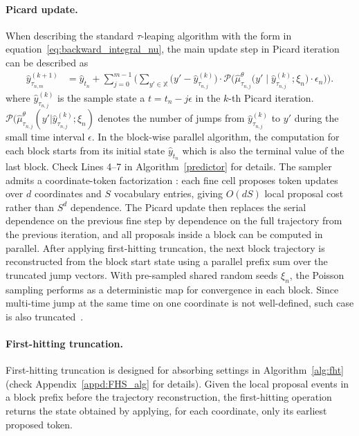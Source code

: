 \documentclass{article}
\def\eqref#1{equation~\ref{#1}}
\begin{document}
\paragraph{Picard update.} When describing the standard $\tau$-leaping algorithm with the form in \eqref{eq:backward_integral_nu}, the main update step in Picard iteration can be described as
\begin{equation}
\begin{split}
\label{eqn:picard_update}
\widehat{y}^{(k+1)}_{\tau_{n,m}}
&=
\widehat{y}_{t_n}
+
\sum\nolimits_{j=0}^{m-1}
\bigg(
\sum\nolimits_{y'\in\mathbb{X}}
\big(
y'-\widehat{y}^{(k)}_{\tau_{n,j}}
\big)
\cdot
\mathcal{P}
\big(
\widehat{\mu}^{\theta}_{\tau_{n,j}}
\big(
y'\mid \widehat{y}^{(k)}_{\tau_{n,j}};\xi_n
\big)
\cdot \epsilon_n
\big)
\bigg).
\end{split}
\end{equation}
where $\widehat{y}^{(k)}_{\tau_{n,j}}$ is the sample state a $t=t_n-j\epsilon$ in the $k$-th Picard iteration. $\mathcal{P}(\widehat{\mu}^{\theta}_{\tau_{n,j}}(y'|\widehat{y}^{(k)}_{\tau_{n,j}};\xi_n)$ denotes the number of jumps from $\widehat{y}^{(k)}_{\tau_{n,j}}$ to $y'$ during the small time interval $\epsilon$. In the block-wise parallel algorithm, the computation for each block starts from its initial state $\widehat{y}_{t_n}$ which is also the terminal value of the last block. Check Lines 4--7 in Algorithm~\ref{predictor} for details. The sampler admits a coordinate-token factorization \citep{campbell2022continuous}: each fine cell proposes token updates over \(d\) coordinates and \(S\) vocabulary entries, giving \(O(dS)\) local proposal cost rather than \(S^d\) dependence.  The Picard update then replaces the serial dependence on the previous fine step by dependence on the full trajectory from the previous iteration, and all proposals inside a block can be computed in parallel. After applying first-hitting truncation, the next block trajectory is reconstructed from the block start state using a parallel prefix sum over the truncated jump vectors. With pre-sampled shared random seeds $\xi_n$, the Poisson sampling performs as a deterministic map for convergence in each block. Since multi-time jump at the same time on one coordinate is not well-defined, such case is also truncated~\citep{liang2025discrete}.
\paragraph{First-hitting truncation.}
First-hitting truncation is designed for absorbing settings in Algorithm~\ref{alg:fht} (check Appendix~\ref{appd:FHS_alg} for details). Given the local proposal events in a block prefix before the trajectory reconstruction, the first-hitting operation returns the state obtained by applying, for each coordinate, only its earliest proposed token.
% 
\end{document}
